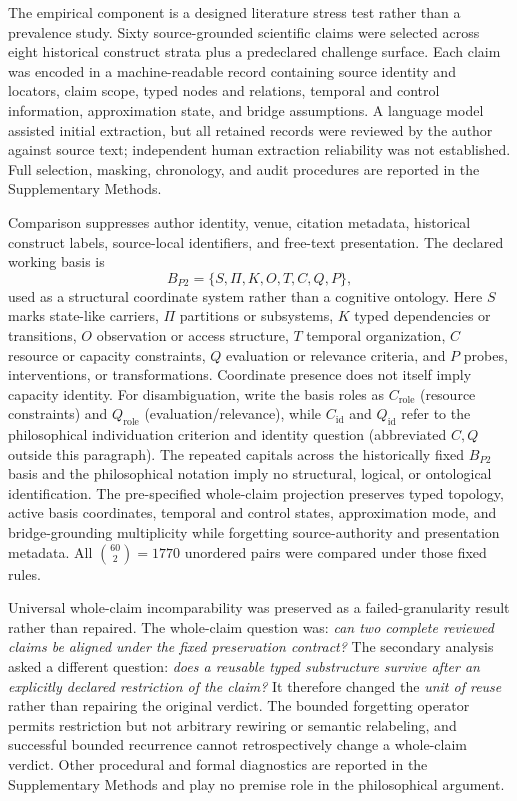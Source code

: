 \documentclass[11pt]{article}
\begin{document}
The empirical component is a designed literature stress test rather than a prevalence study. Sixty source-grounded scientific claims were selected across eight historical construct strata plus a predeclared challenge surface. Each claim was encoded in a machine-readable record containing source identity and locators, claim scope, typed nodes and relations, temporal and control information, approximation state, and bridge assumptions. A language model assisted initial extraction, but all retained records were reviewed by the author against source text; independent human extraction reliability was not established. Full selection, masking, chronology, and audit procedures are reported in the Supplementary Methods.

Comparison suppresses author identity, venue, citation metadata, historical construct labels, source-local identifiers, and free-text presentation. The declared working basis is
\[
B_{P2}=\{S,\Pi,K,O,T,C,Q,P\},
\]
used as a structural coordinate system rather than a cognitive ontology. Here \(S\) marks state-like carriers, \(\Pi\) partitions or subsystems, \(K\) typed dependencies or transitions, \(O\) observation or access structure, \(T\) temporal organization, \(C\) resource or capacity constraints, \(Q\) evaluation or relevance criteria, and \(P\) probes, interventions, or transformations. Coordinate presence does not itself imply capacity identity. For disambiguation, write the basis roles as \(C_{\mathrm{role}}\) (resource constraints) and \(Q_{\mathrm{role}}\) (evaluation/relevance), while \(C_{\mathrm{id}}\) and \(Q_{\mathrm{id}}\) refer to the philosophical individuation criterion and identity question (abbreviated \(C,Q\) outside this paragraph). The repeated capitals across the historically fixed \(B_{P2}\) basis and the philosophical notation imply no structural, logical, or ontological identification. The pre-specified whole-claim projection preserves typed topology, active basis coordinates, temporal and control states, approximation mode, and bridge-grounding multiplicity while forgetting source-authority and presentation metadata. All \(\binom{60}{2}=1770\) unordered pairs were compared under those fixed rules.

Universal whole-claim incomparability was preserved as a failed-granularity result rather than repaired. The whole-claim question was: \emph{can two complete reviewed claims be aligned under the fixed preservation contract?} The secondary analysis asked a different question: \emph{does a reusable typed substructure survive after an explicitly declared restriction of the claim?} It therefore changed the \emph{unit of reuse} rather than repairing the original verdict. The bounded forgetting operator permits restriction but not arbitrary rewiring or semantic relabeling, and successful bounded recurrence cannot retrospectively change a whole-claim verdict. Other procedural and formal diagnostics are reported in the Supplementary Methods and play no premise role in the philosophical argument.
\end{document}
